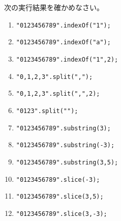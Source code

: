 \begin{Prob}\upshape\Must
 次の実行結果を確かめなさい。
 \begin{enumerate}
	\item \texttt{"0123456789".indexOf("1");}
	\item \texttt{"0123456789".indexOf("a");}
	\item \texttt{"0123456789".indexOf("1",2);}
	\item \texttt{"0,1,2,3".split(",");}
	\item \texttt{"0,1,2,3".split(",",2);}
	\item \texttt{"0123".split("");}
	\item \texttt{"0123456789".substring(3);}
	\item \texttt{"0123456789".substring(-3);}
	\item \texttt{"0123456789".substring(3,5);}
	\item \texttt{"0123456789".slice(-3);}
	\item \texttt{"0123456789".slice(3,5);}
	\item \texttt{"0123456789".slice(3,-3);}
 \end{enumerate}
\end{Prob}
